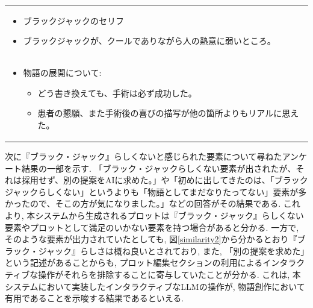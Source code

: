 \documentclass[a4j,12pt]{jsreport}
\begin{document}
\begin{tabularx}{12cm}{X}
\begin{minipage}{\linewidth}
\begin{itemize}[itemsep=0pt, parsep=2pt]
\begin{itemize}[itemsep=0pt, parsep=2pt]
                  \item ブラックジャックのセリフ
                  \item ブラックジャックが、クールでありながら人の熱意に弱いところ。
               \end{itemize}
         \end{itemize}
         \vspace{0.5cm}
   \end{minipage} \\
   \begin{minipage}{\linewidth}
      \vspace{0.1cm}
         \begin{itemize}[itemsep=0pt, parsep=2pt]
            \item 物語の展開について:
               \begin{itemize}[itemsep=0pt, parsep=2pt]
                  \item どう書き換えても、手術は必ず成功した。
                  \item 患者の懇願、また手術後の喜びの描写が他の箇所よりもリアルに思えた。
               \end{itemize}
         \end{itemize}
         \vspace{0.1cm}
      
   \end{minipage}\\
   \hline
\end{tabularx}

次に『ブラック・ジャック』らしくないと感じられた要素について尋ねたアンケート結果の一部を示す. 「ブラック・ジャックらしくない要素が出されたが、それは採用せず、別の提案をAIに求めた。」や「初めに出してきたのは、「ブラックジャックらしくない」というよりも「物語としてまだなりたってない」要素が多かったので、そこの方が気になりました。」などの回答がその結果である. これより, 本システムから生成されるプロットは『ブラック・ジャック』らしくない要素やプロットとして満足のいかない要素を持つ場合があると分かる. 一方で, そのような要素が出力されていたとしても, 図\ref{similarity2}から分かるとおり『ブラック・ジャック』らしさは概ね良いとされており, また, 「別の提案を求めた」という記述があることからも, プロット編集セクションの利用によるインタラクティブな操作がそれらを排除することに寄与していたことが分かる. これは, 本システムにおいて実装したインタラクティブなLLMの操作が, 物語創作において有用であることを示唆する結果であるといえる.
\end{document}
